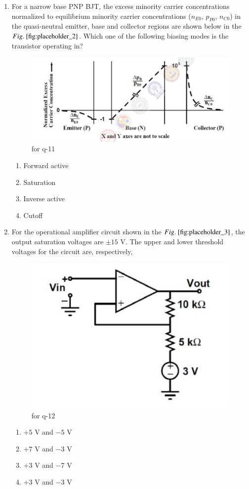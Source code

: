 \documentclass[journal,12pt,onecolumn]{IEEEtran}
\theoremstyle{remark}
\begin{document}
\begin{enumerate}
\item For a narrow base PNP BJT, the excess minority carrier concentrations  normalized to equilibrium minority carrier concentrations ($n_{E0}$, $p_{P0}$, $n_{C0}$) in the quasi-neutral emitter, base and collector regions are shown below in the $\figref{fig:placeholder_2}$. Which one of the following biasing modes is the transistor operating in?
\begin{figure}[H]
    \centering
    \includegraphics[width=0.5\columnwidth]{figs/2.png}
    \caption{\centering for q-11}
    \label{fig:placeholder_2}
\end{figure}
\begin{multicols}{4}
\begin{enumerate}
\item Forward active
\item Saturation
\item Inverse active
\item Cutoff
\end{enumerate}
\end{multicols}
\hfill {}

\item For the operational amplifier circuit shown in the $\figref{fig:placeholder_3}$, the output saturation voltages are $\pm 15$ V. The upper and lower threshold voltages for the circuit are, respectively,
\begin{figure}[H]
    \centering
    \includegraphics[width=0.5\columnwidth]{figs/3.png}
    \caption{\centering for q-12}
    \label{fig:placeholder_3}
\end{figure}
\begin{multicols}{4}
\begin{enumerate}
\item $+5$ V and $-5$ V
\item $+7$ V and $-3$ V
\item $+3$ V and $-7$ V
\item $+3$ V and $-3$ V
\end{enumerate}
\end{multicols}
\hfill {}


\end{enumerate}
\end{document}
